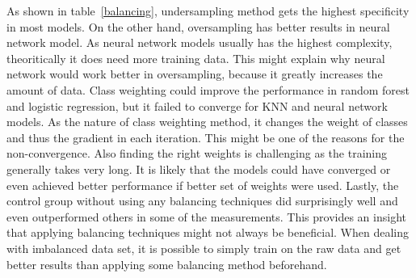 \documentclass{article}
\begin{document}
As shown in table~\ref{balancing}, undersampling method gets the highest specificity in most models. On the other hand, oversampling has better results in neural network model. As neural network models usually has the highest complexity, theoritically it does need more training data. This might explain why neural network would work better in oversampling, because it greatly increases the amount of data. Class weighting could improve the performance in random forest and logistic regression, but it failed to converge for KNN and neural network models. As the nature of class weighting method, it changes the weight of classes and thus the gradient in each iteration. This might be one of the reasons for the non-convergence. Also finding the right weights is challenging as the training generally takes very long. It is likely that the models could have converged or even achieved better performance if better set of weights were used. Lastly, the control group without using any balancing techniques did surprisingly well and even outperformed others in some of the measurements. This provides an insight that applying balancing techniques might not always be beneficial. When dealing with imbalanced data set, it is possible to simply train on the raw data and get better results than applying some balancing method beforehand.
\end{document}
